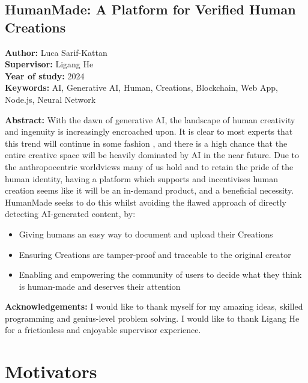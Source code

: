 \documentclass[12pt,a4paper]{article}
\begin{document}
\begin{center}
    \section*{HumanMade: A Platform for Verified Human Creations}
    \textbf{Author:} Luca Sarif-Kattan\\
    \textbf{Supervisor:} Ligang He\\
    \textbf{Year of study:} 2024\\
    \textbf{Keywords:} AI, Generative AI, Human, Creations, Blockchain, Web App, Node.js, Neural Network
\end{center}

\newpage

\noindent \textbf{Abstract:} With the dawn of generative AI, the landscape of human creativity and ingenuity is increasingly encroached upon. It is clear to most experts that this trend will continue in some fashion \cite{aiimpacts}, and there is a high chance that the entire creative space will be heavily dominated by AI in the near future. Due to the anthropocentric worldviews many of us hold \cite{anthropocentric} and to retain the pride of the human identity, having a platform which supports and incentivises human creation seems like it will be an in-demand product, and a beneficial necessity. HumanMade seeks to do this whilst avoiding the flawed approach of directly detecting AI-generated content, by:
\begin{itemize}
    \item Giving humans an easy way to document and upload their Creations
    \item Ensuring Creations are tamper-proof and traceable to the original creator
    \item Enabling and empowering the community of users to decide what they think is human-made and deserves their attention
\end{itemize}

\vspace{10pt}
\noindent \textbf{Acknowledgements:} I would like to thank myself for my amazing ideas, skilled programming and genius-level problem solving. I would like to thank Ligang He for a frictionless and enjoyable supervisor experience.

\newpage
\tableofcontents
\newpage

\section{Motivators}
\end{document}
